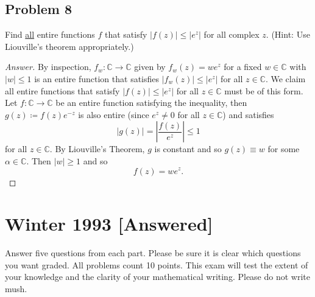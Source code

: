 \documentclass[12pt]{article}
\newcommand{\cx}{\mathbb{C}}
\theoremstyle{definition}
\begin{document}
\subsection{Problem 8}
Find \underline{all} entire functions $f$ that satisfy $|f(z)| \leq |e^z|$ for all complex $z$. (Hint: Use Liouville's theorem appropriately.)
\begin{proof}[Answer]
    By inspection, $f_w : \cx \to \cx$ given by $f_w(z) = w e^z$ for a fixed $w \in \cx$ with $|w| \leq 1$ is an entire function that satisfies $|f_w(z)| \leq |e^z|$ for all $z \in \cx$. We claim all entire functions that satisfy $|f(z)| \leq |e^z|$ for all $z \in \cx$ must be of this form. Let $f : \cx \to \cx$ be an entire function satisfying the inequality, then $g(z) \coloneqq f(z)e^{-z}$ is also entire (since $e^{z} \neq 0$ for all $z \in \cx$) and satisfies
    \[
        |g(z)| = \left| \frac{f(z)}{e^z} \right| \leq 1
    \]
    for all $z \in \cx$. By Liouville's Theorem, $g$ is constant and so $g(z) \equiv w$ for some $\alpha \in \cx$. Then $|w| \geq 1$ and so 
    \[
        f(z) = w e^z.
    \] 
\end{proof}
\newpage
\section{Winter 1993 [Answered]}
Answer five questions from each part. Please be sure it is clear which questions you want graded. All problems count 10 points. This exam will test the extent of your knowledge and the clarity of your mathematical writing. Please do not write mush.
\end{document}
